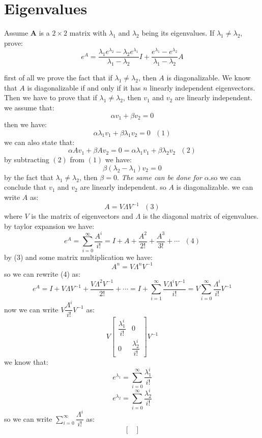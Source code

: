 \section{Eigenvalues}
Assume \textbf{A} is a $2 \times 2$ matrix with $\lambda_1$ and $\lambda_2$ being its eigenvalues. If $\lambda_1 \neq \lambda_2$, prove:
$$e^A = \dfrac{\lambda_1 e^ {\lambda_2} - \lambda_2 e^{\lambda_1}}{\lambda_1 - \lambda_2}I +\dfrac{e^{\lambda_1} - e^{\lambda_2}}{\lambda_1 - \lambda_2}A$$
\begin{qsolve}
	\begin{qsolve}[]
		first of all we prove the fact that if $\lambda_1 \neq \lambda_2$, then $A$ is diagonalizable. We know that $A$ is diagonalizable if and only if it has $n$ linearly independent eigenvectors. Then we have to prove that if $\lambda_1 \neq \lambda_2$, then $v_1$ and $v_2$ are linearly independent. 
		we assume that:
		$$\alpha v_1 + \beta v_2 = 0$$
		then we have:
		$$\alpha \lambda_1 v_1 + \beta \lambda_1 v_2 = 0\ \ \ (1)$$
		we can also state that:
		$$\alpha  A v_1 + \beta  A v_2 = 0 = \alpha \lambda_1 v_1 + \beta \lambda_2 v_2\ \ \ (2)$$
		by subtracting $(2)$ from $(1)$ we have:
		$$\beta (\lambda_2 - \lambda_1) v_2 = 0$$
		by the fact that $\lambda_1 \neq \lambda_2$, then $\beta = 0$. \textit{The same can be done for $\alpha$}.so we can conclude that $v_1$ and $v_2$ are linearly independent. so $A$ is diagonalizable.
		we can write $A$ as:
		$$A = V \Lambda V^{-1}\ \ \ (3)$$
		where $V$ is the matrix of eigenvectors and $\Lambda$ is the diagonal matrix of eigenvalues. by taylor expansion we have:
		$$e^A = \sum_{i=0}^{\infty} \dfrac{A^i}{i!} = I + A + \dfrac{A^2}{2!} + \dfrac{A^3}{3!} + \cdots\ \ \ (4)$$
		by (3) and some matrix multiplication we have:
		$$A^n = V \Lambda^n V^{-1}$$
		so we can rewrite (4) as:
		$$e^A = I + V \Lambda V^{-1} + \dfrac{V \Lambda^2 V^{-1}}{2!} + \cdots = I + \sum_{i=1}^{\infty} \dfrac{V \Lambda^i V^{-1}}{i!} = V \sum_{i=0}^{\infty} \dfrac{\Lambda^i}{i!} V^{-1} $$
		now we can write $V \dfrac{\Lambda^i}{i!} V^{-1}$ as:
		\splitqsolve[\splitqsolve]
		$$ V \begin{bmatrix}
			\dfrac{\lambda_1^i}{i!} & 0\\
			0 & \dfrac{\lambda_2^i}{i!}
		\end{bmatrix} V^{-1} $$
		we know that:
		$$e^{\lambda_1} = \sum_{i=0}^{\infty} \dfrac{\lambda_1^i}{i!}$$
		$$e^{\lambda_2} = \sum_{i=0}^{\infty} \dfrac{\lambda_2^i}{i!}$$
		so we can write $\sum_{i=0}^{\infty} \dfrac{\Lambda^i}{i!}$ as:
		$$\begin{bmatrix}

\end{bmatrix}$$
\end{qsolve}
\end{qsolve}
